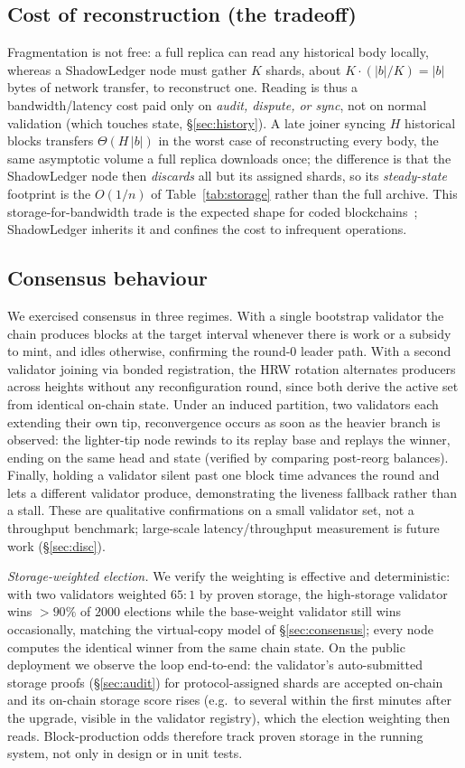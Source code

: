 \subsection{Cost of reconstruction (the tradeoff)}
Fragmentation is not free: a full replica can read any historical body locally, whereas a
ShadowLedger node must gather $K$ shards, about $K\cdot(|b|/K)=|b|$ bytes of network
transfer, to reconstruct one. Reading is thus a bandwidth/latency cost paid only on
\emph{audit, dispute, or sync}, not on normal validation (which touches state, \S\ref{sec:history}).
A late joiner syncing $H$ historical blocks transfers $\Theta(H\,|b|)$ in the worst case of
reconstructing every body, the same asymptotic volume a full replica downloads once; the
difference is that the ShadowLedger node then \emph{discards} all but its assigned shards, so its
\emph{steady-state} footprint is the $O(1/n)$ of Table~\ref{tab:storage} rather than the full
archive. This storage-for-bandwidth trade is the expected shape for coded
blockchains~\cite{kadhe2019sef,perard2018erasure}; ShadowLedger inherits it and confines the cost
to infrequent operations.

\subsection{Consensus behaviour}
We exercised consensus in three regimes. With a single bootstrap validator the chain produces
blocks at the target interval whenever there is work or a subsidy to mint, and idles otherwise,
confirming the round-0 leader path. With a second validator joining via bonded registration, the
HRW rotation alternates producers across heights without any reconfiguration round, since both
derive the active set from identical on-chain state. Under an induced partition, two validators
each extending their own tip, reconvergence occurs as soon as the heavier branch is observed:
the lighter-tip node rewinds to its replay base and replays the winner, ending on the same head
and state (verified by comparing post-reorg balances). Finally, holding a validator silent past
one block time advances the round and lets a different validator produce, demonstrating the
liveness fallback rather than a stall. These are qualitative confirmations on a small validator
set, not a throughput benchmark; large-scale latency/throughput measurement is future work
(\S\ref{sec:disc}).

\emph{Storage-weighted election.} We verify the weighting is effective and deterministic: with two
validators weighted $65{:}1$ by proven storage, the high-storage validator wins $>90\%$ of $2000$
elections while the base-weight validator still wins occasionally, matching the virtual-copy model
of \S\ref{sec:consensus}; every node computes the identical winner from the same chain state. On the public
deployment we observe the loop end-to-end: the validator's auto-submitted storage proofs
(\S\ref{sec:audit}) for protocol-assigned shards are accepted on-chain and its on-chain storage
score rises (e.g.\ to several within the first minutes after the upgrade, visible in the validator
registry), which the election weighting then reads. Block-production odds therefore track proven
storage in the running system, not only in design or in unit tests.


